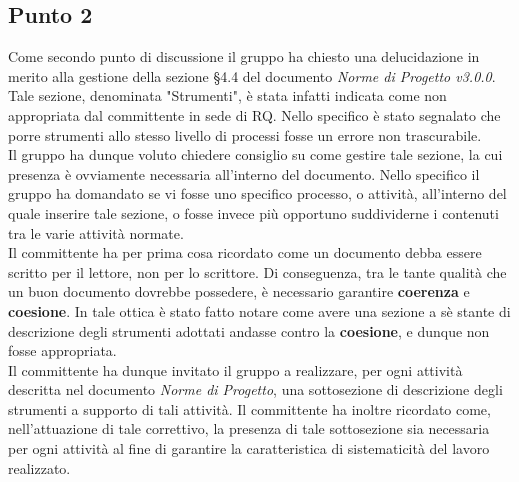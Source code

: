 \subsection{Punto 2}
Come secondo punto di discussione il gruppo ha chiesto una delucidazione in merito alla gestione della sezione §4.4 del documento \textit{Norme di Progetto v3.0.0}. Tale sezione, denominata "Strumenti", è stata infatti indicata come non appropriata dal committente in sede di RQ. Nello specifico è stato segnalato che porre strumenti allo stesso livello di processi fosse un errore non trascurabile.\\
Il gruppo ha dunque voluto chiedere consiglio su come gestire tale sezione, la cui presenza è ovviamente necessaria all'interno del documento. Nello specifico il gruppo ha domandato se vi fosse uno specifico processo, o attività, all'interno del quale inserire tale sezione, o fosse invece più opportuno suddividerne i contenuti tra le varie attività normate.\\
Il committente ha per prima cosa ricordato come un documento debba essere scritto per il lettore, non per lo scrittore. Di conseguenza, tra le tante qualità che un buon documento dovrebbe possedere, è necessario garantire \textbf{coerenza} e \textbf{coesione}. In tale ottica è stato fatto notare come avere una sezione a sè stante di descrizione degli strumenti adottati andasse contro la \textbf{coesione}, e dunque non fosse appropriata.\\
Il committente ha dunque invitato il gruppo a realizzare, per ogni attività descritta nel documento \textit{Norme di Progetto}, una sottosezione di descrizione degli strumenti a supporto di tali attività. Il committente ha inoltre ricordato come, nell'attuazione di tale correttivo, la presenza di tale sottosezione sia necessaria per ogni attività al fine di garantire la caratteristica di sistematicità del lavoro realizzato.


